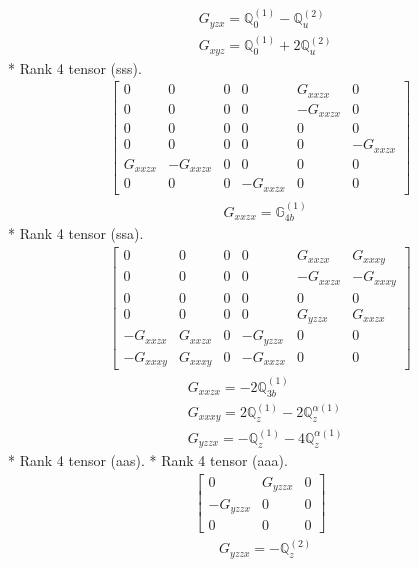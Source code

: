 \documentclass[fleqn,8pt,landscape]{jsarticle}
\begin{document}
\begin{align*}
& G_{yzx} = \mathbb{Q}_{0}^{(1)} - \mathbb{Q}_{u}^{(2)} \\
& G_{xyz} = \mathbb{Q}_{0}^{(1)} + 2 \mathbb{Q}_{u}^{(2)}
\end{align*}
* Rank 4 tensor (sss).
\begin{align*}
\begin{bmatrix} 0 & 0 & 0 & 0 & G_{xxzx} & 0 \\ 0 & 0 & 0 & 0 & - G_{xxzx} & 0 \\ 0 & 0 & 0 & 0 & 0 & 0 \\ 0 & 0 & 0 & 0 & 0 & - G_{xxzx} \\ G_{xxzx} & - G_{xxzx} & 0 & 0 & 0 & 0 \\ 0 & 0 & 0 & - G_{xxzx} & 0 & 0 \end{bmatrix}
\end{align*}
\begin{align*}
& G_{xxzx} = \mathbb{G}_{4b}^{(1)}
\end{align*}
* Rank 4 tensor (ssa).
\begin{align*}
\begin{bmatrix} 0 & 0 & 0 & 0 & G_{xxzx} & G_{xxxy} \\ 0 & 0 & 0 & 0 & - G_{xxzx} & - G_{xxxy} \\ 0 & 0 & 0 & 0 & 0 & 0 \\ 0 & 0 & 0 & 0 & G_{yzzx} & G_{xxzx} \\ - G_{xxzx} & G_{xxzx} & 0 & - G_{yzzx} & 0 & 0 \\ - G_{xxxy} & G_{xxxy} & 0 & - G_{xxzx} & 0 & 0 \end{bmatrix}
\end{align*}
\begin{align*}
& G_{xxzx} = - 2 \mathbb{Q}_{3b}^{(1)} \\
& G_{xxxy} = 2 \mathbb{Q}_{z}^{(1)} - 2 \mathbb{Q}_{z}^{\alpha(1)} \\
& G_{yzzx} = - \mathbb{Q}_{z}^{(1)} - 4 \mathbb{Q}_{z}^{\alpha(1)}
\end{align*}
* Rank 4 tensor (aas).
* Rank 4 tensor (aaa).
\begin{align*}
\begin{bmatrix} 0 & G_{yzzx} & 0 \\ - G_{yzzx} & 0 & 0 \\ 0 & 0 & 0 \end{bmatrix}
\end{align*}
\begin{align*}
& G_{yzzx} = - \mathbb{Q}_{z}^{(2)}
\end{align*}
\end{document}
